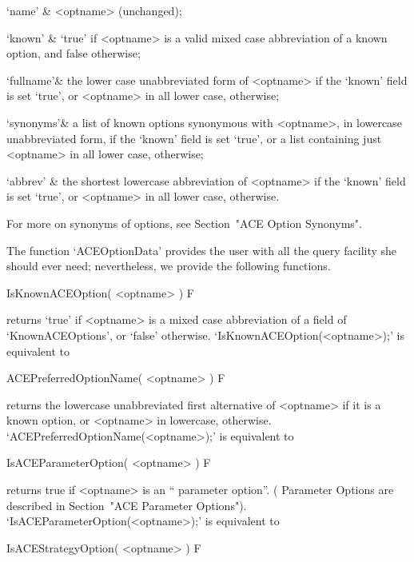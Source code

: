 \beginitems

\quad`name'   & <optname> (unchanged);

\quad`known'  & `true' if <optname> is a valid mixed case abbreviation
of a known {\ACE} option, and false otherwise;

\quad`fullname'& the lower case unabbreviated form of <optname> if the
`known'  field  is  set  `true',  or  <optname>  in  all  lower  case,
otherwise;

\quad`synonyms'& a  list  of  known  {\ACE}  options  synonymous  with
<optname>, in lowercase unabbreviated form, if the  `known'  field  is
set `true', or a list containing just <optname>  in  all  lower  case,
otherwise;

\quad`abbrev' & the shortest lowercase abbreviation  of  <optname>  if
the `known' field is set `true',  or  <optname>  in  all  lower  case,
otherwise.

\enditems

For more on  synonyms  of  {\ACE}  options,  see  Section~"ACE  Option
Synonyms".

The function `ACEOptionData' provides the  user  with  all  the  query
facility she should ever need; nevertheless, we provide the  following
functions.

\>IsKnownACEOption( <optname> ) F

returns `true' if <optname> is a mixed case abbreviation of a field of
`KnownACEOptions',           or           `false'           otherwise.
`IsKnownACEOption(<optname>);' is equivalent to

\)

\>ACEPreferredOptionName( <optname> ) F

returns the lowercase unabbreviated first alternative of <optname>  if
it is a known {\ACE} option, or  <optname>  in  lowercase,  otherwise.
`ACEPreferredOptionName(<optname>);' is equivalent to

\)

\>IsACEParameterOption( <optname> ) F

returns true if <optname> is an ``{\ACE} parameter option''. ({\ACE}
Parameter Options are described in Section~"ACE  Parameter  Options").
`IsACEParameterOption(<optname>);' is equivalent to

\)

\>IsACEStrategyOption( <optname> ) F

